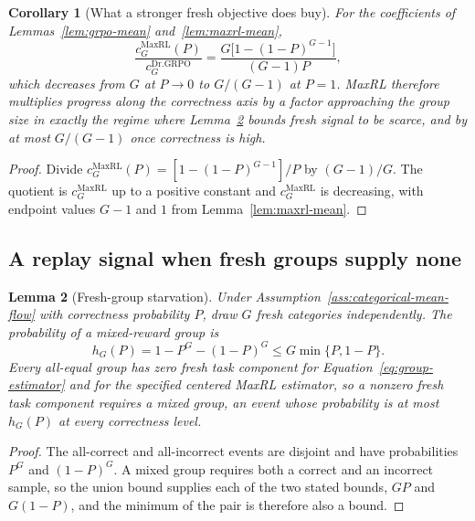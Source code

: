 \documentclass{article}
\newcommand{\1}{\mathbf 1}
\newtheorem{lemma}{Lemma}[section]
\newtheorem{corollary}[lemma]{Corollary}
\theoremstyle{remark}
\theoremstyle{definition}
\theoremstyle{plain}
\begin{document}
\begin{corollary}[What a stronger fresh objective does buy]
\label{cor:maxrl-starvation}
For the coefficients of Lemmas~\ref{lem:grpo-mean} and~\ref{lem:maxrl-mean},
\[
 \frac{c_G^{\mathrm{MaxRL}}(P)}{c_G^{\mathrm{Dr.GRPO}}}
 =\frac{G\big[1-(1-P)^{G-1}\big]}{(G-1)P},
\]
which decreases from $G$ at $P\to0$ to $G/(G-1)$ at $P=1$. MaxRL therefore
multiplies progress along the correctness axis by a factor approaching the
group size in exactly the regime where
Lemma~\ref{lem:replay-gradient-availability} bounds fresh signal to be scarce,
and by at most $G/(G-1)$ once correctness is high.
\end{corollary}

\begin{proof}
Divide $c_G^{\mathrm{MaxRL}}(P)=[1-(1-P)^{G-1}]/P$ by $(G-1)/G$. The quotient
is $c_G^{\mathrm{MaxRL}}$ up to a positive constant and
$c_G^{\mathrm{MaxRL}}$ is decreasing, with endpoint values $G-1$ and $1$ from
Lemma~\ref{lem:maxrl-mean}.
\end{proof}

\subsection{A replay signal when fresh groups supply none}
\label{app:theory-gradient-availability}

\begin{lemma}[Fresh-group starvation]
\label{lem:replay-gradient-availability}
Under Assumption~\ref{ass:categorical-mean-flow} with correctness probability
$P$, draw $G$ fresh categories independently. The probability of a
mixed-reward group is
\[
 h_G(P)=1-P^G-(1-P)^G\le G\min\{P,1-P\}.
\]
Every all-equal group has zero fresh task component for
Equation~\eqref{eq:group-estimator} and for the specified centered MaxRL
estimator, so a nonzero fresh task component requires a mixed group, an event
whose probability is at most $h_G(P)$ at every correctness level.
\end{lemma}

\begin{proof}
The all-correct and all-incorrect events are disjoint and have probabilities
$P^G$ and $(1-P)^G$. A mixed group requires both a correct and an incorrect
sample, so the union bound supplies each of the two stated bounds, $GP$ and
$G(1-P)$, and the minimum of the pair is therefore also a bound.
\end{proof}
\end{document}
